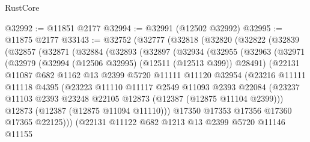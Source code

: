 \begin{lexlean}{RustCore}
\begin{coremodule}
@32992 := @11851 @2177
@32994 := @32991 (@12502 @32992)
@32995 := @11875 @2177
@33143 := @32752
    (@32777
      (@32818
        (@32820
          (@32822
            (@32839
              (@32857
                (@32871
                  (@32884
                    (@32893
                      (@32897
                        (@32934
                          (@32955
                            (@32963
                              (@32971
                                (@32979
                                  (@32994 (@12506 @32995) (@12511 (@12513 @399)) @28491)
                                  (@22131
                                    @11087
                                    @682
                                    @1162
                                    @13
                                    @2399
                                    @5720
                                    @11111
                                    @11120
                                    @32954
                                    (@23216
                                      @11111
                                      @11118
                                      @4395
                                      (@23223
                                        @11110
                                        @11117
                                        @2549
                                        @11093
                                        @2393
                                        @22084
                                        (@23237
                                          @11103
                                          @2393
                                          @23248
                                          @22105
                                          @12873
                                          (@12387 (@12875 @11104 @2399)))
                                        @12873
                                        (@12387 (@12875 @11094 @11110)))
                                      @17350
                                      @17353
                                      @17356
                                      @17360
                                      @17365
                                      @22125)))
                                (@22131
                                  @11122
                                  @682
                                  @1213
                                  @13
                                  @2399
                                  @5720
                                  @11146
                                  @11155

\end{coremodule}
\end{lexlean}
